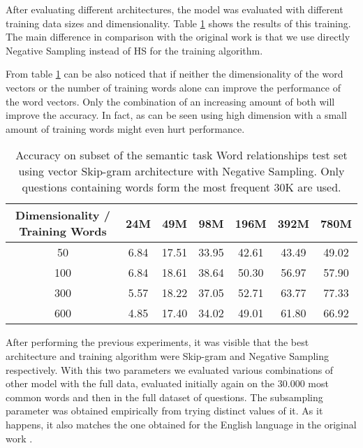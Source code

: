 After evaluating different architectures, the  model was evaluated with
different  training data sizes and dimensionality. Table
\ref{tab:initial_w2v_training}  shows the results of this training. The main
difference in comparison with the original work is that we use directly
Negative Sampling  instead of \ac{HS} for the training algorithm. 


From table \ref{tab:initial_w2v_training} can be also noticed that if 
neither the dimensionality of the word vectors or the number of
training words alone can improve the performance of the word vectors. Only the
combination of an increasing amount of both will improve the accuracy. In
fact, as can be seen using high dimension with a small amount of training
words might even hurt performance.


\begin{table}[h]
\centering
\caption{Accuracy on subset of the semantic task Word relationships test set using
vector Skip-gram architecture with Negative Sampling. Only questions containing words form the most
 frequent 30K are used. } 
\label{tab:initial_w2v_training}

\small
\begin{tabular}{|c|cccccc|}
\hline
 Dimensionality / Training Words  &   24M  &    49M  &    98M  &   196M  &   392M  &   780M  \\
\hline
                              50  &  6.84  &  17.51  &  33.95  &  42.61  &  43.49  &  49.02  \\
                             100  &  6.84  &  18.61  &  38.64  &  50.30  &  56.97  &  57.90  \\
                             300  &  5.57  &  18.22  &  37.05  &  52.71  &  63.77  &  77.33  \\
                             600  &  4.85  &  17.40  &  34.02  &  49.01  &
                             61.80  &  66.92  \\
\hline
\end{tabular}
\end{table}


After performing the previous experiments, it was visible that the best
architecture and training algorithm were Skip-gram and Negative Sampling
respectively. With this two parameters we evaluated various combinations of
other model with the full data, evaluated initially again on the 30.000 most
common words  and then in the full dataset of questions. The subsampling
parameter was obtained empirically from trying distinct values of it. As it
happens, it also matches the one obtained for the English language in the
original work \cite{DBLP:journals/corr/abs-1301-3781}.

